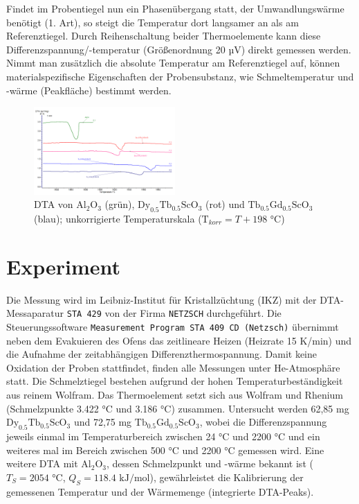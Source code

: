 \documentclass[aps,twocolumn,secnumarabic,nobalancelastpage,amsmath,amssymb,
nofootinbib,superscriptaddress]{revtex4-1}
\begin{document}
Findet im Probentiegel nun ein Phasenübergang statt, der Umwandlungswärme benötigt (1. Art), so steigt die Temperatur dort langsamer an als am Referenztiegel. Durch Reihenschaltung beider
Thermoelemente kann diese Differenzspannung/-temperatur (Größenordnung 20 $\text{µV}$) direkt gemessen werden. Nimmt man zusätzlich die absolute Temperatur am Referenztiegel auf, können materialspezifische Eigenschaften
der Probensubstanz, wie Schmeltemperatur und -wärme (Peakfläche) bestimmt werden.



\begin{figure}[t]
  \centering
   \includegraphics[width=0.48\textwidth]{../img/Messkurven_unsere.png}
  \caption{\label{fig:dtaDyTb+TbGd} DTA von $\text{Al}_{2}\text{O}_3$ (grün), $\text{Dy}_{0.5}\text{Tb}_{0.5}\text{ScO}_3$ (rot)
  und $\text{Tb}_{0.5}\text{Gd}_{0.5}\text{ScO}_3$ (blau); unkorrigierte Temperaturskala ($\text{T}_{korr}=T + 198\text{ °C}$)}
\end{figure}

\section{Experiment}
\noindent Die Messung wird im Leibniz-Institut für Kristallzüchtung (IKZ) mit der DTA-Messaparatur \texttt{STA 429} von der Firma \texttt{NETZSCH} durchgeführt. Die Steuerungssoftware
\texttt{Measurement Program STA 409 CD (Netzsch)} übernimmt neben dem Evakuieren des Ofens das zeitlineare Heizen (Heizrate 15 K/min) und die Aufnahme der zeitabhängigen Differenzthermospannung.
Damit keine Oxidation der Proben stattfindet, finden alle Messungen unter He-Atmosphäre statt. Die Schmelztiegel bestehen aufgrund der hohen
Temperaturbeständigkeit aus reinem Wolfram. Das Thermoelement setzt sich aus Wolfram und Rhenium (Schmelzpunkte 3.422 °C und 3.186 °C) zusammen.
Untersucht werden 62,85 mg $\text{Dy}_{0.5}\text{Tb}_{0.5}\text{ScO}_3$ und 72,75 mg $\text{Tb}_{0.5}\text{Gd}_{0.5}\text{ScO}_3$, wobei die Differenzspannung jeweils
einmal im Temperaturbereich zwischen 24 °C und 2200 °C und ein weiteres mal im Bereich zwischen 500 °C und 2200 °C gemessen wird. Eine weitere DTA
mit $\text{Al}_2\text{O}_3$, dessen Schmelzpunkt und -wärme bekannt ist ($T_S=2054\text{ °C}$, $Q_S=118.4\text{ kJ/mol}$), gewährleistet die Kalibrierung der gemessenen Temperatur
und der Wärmemenge (integrierte DTA-Peaks).
\end{document}
